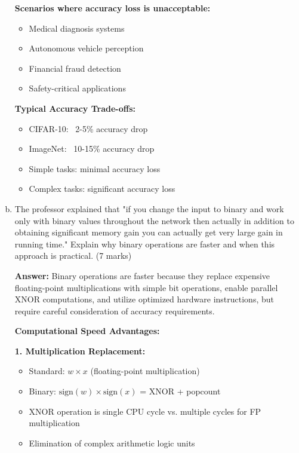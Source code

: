 \documentclass[12pt]{article}
\newcommand{\answer}[1]{{\color{answercolor}\textbf{Answer:} #1}}
\newcommand{\explanation}[1]{{\color{explanationcolor}#1}}
\begin{document}
\begin{enumerate}[(a)]
{    \textbf{Scenarios where accuracy loss is unacceptable:}
    \begin{itemize}
        \item Medical diagnosis systems
        \item Autonomous vehicle perception
        \item Financial fraud detection
        \item Safety-critical applications
    \end{itemize}
    
    \textbf{Typical Accuracy Trade-offs:}
    \begin{itemize}
        \item CIFAR-10: ~2-5\% accuracy drop
        \item ImageNet: ~10-15\% accuracy drop
        \item Simple tasks: minimal accuracy loss
        \item Complex tasks: significant accuracy loss
    \end{itemize}
    }
    
    \item The professor explained that "if you change the input to binary and work only with binary values throughout the network then actually in addition to obtaining significant memory gain you can actually get very large gain in running time." Explain why binary operations are faster and when this approach is practical. \hfill (7 marks)
    
    \answer{Binary operations are faster because they replace expensive floating-point multiplications with simple bit operations, enable parallel XNOR computations, and utilize optimized hardware instructions, but require careful consideration of accuracy requirements.}
    
    \explanation{
    \textbf{Computational Speed Advantages:}
    
    \textbf{1. Multiplication Replacement:}
    \begin{itemize}
        \item Standard: $w \times x$ (floating-point multiplication)
        \item Binary: $\text{sign}(w) \times \text{sign}(x)$ = XNOR + popcount
        \item XNOR operation is single CPU cycle vs. multiple cycles for FP multiplication
        \item Elimination of complex arithmetic logic units
    \end{itemize}
    
}
\end{enumerate}
\end{document}
